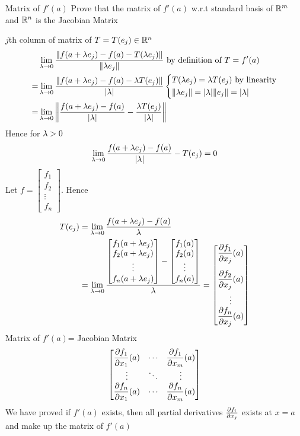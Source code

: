 \begin{Theorem}{Matrix of $f'(a)$}{}
	Prove that the matrix  of $f'(a)$ w.r.t standard basis of $\mathbb{R}^m$ and $\mathbb{R}^n$ is the Jacobian Matrix
\end{Theorem}
\begin{myproof}
	$j$th column of matrix of $T=T(e_j)\in\mathbb{R}^n$
\begin{align*}
	& \lim_{\lm\to0}\frac{\|f(a+\lm e_j)-f(a)-T(\lm e_j)\|}{\|\lm e_j\|}\text{ by definition of }T=f'(a)\\
	= & \lim_{\lm\to0}\frac{\|f(a+\lm e_j)-f(a)-\lm T(e_j)\|}{|\lm|}\begin{cases*}
		T(\lm e_j)=\lm T(e_j)\text{ by linearity} \\
		\|\lm e_j\|=|\lm|\|e_j\|=|\lm|
	\end{cases*}\\
	= & \lim_{\lm\to0}\left\|\frac{f(a+\lm e_j)-f(a)}{|\lm|}-\frac{\lm T(e_j)}{|\lm|}\right\|
\end{align*}Hence for $\lambda>0$ $$\lim_{\lambda\to0}\frac{f(a+\lambda e_j)-f(a)}{|\lambda|}-T(e_j)=0$$Let $f=\begin{bmatrix}
f_1\\ f_2 \\ \vdots\\ f_n\end{bmatrix}$. Hence \begin{align*}
T(e_j) & =\lim_{\lambda\to 0}\frac{f(a+\lambda e_j)-f(a)}{\lambda}\\
& =\lim_{\lambda\to 0}\frac{\begin{bmatrix}
	f_1(a+\lambda e_j) \\
	f_2(a+\lambda e_j) \\
	\vdots         \\
	f_n(a+\lambda e_j)
\end{bmatrix}-\begin{bmatrix}
	f_1(a) \\
	f_2(a) \\
	\vdots \\
	f_n(a)
\end{bmatrix}}{\lambda} =\begin{bmatrix}
		\dfrac{\partial f_1}{\partial x_j}(a) \\[5mm]
		\dfrac{\partial f_2}{\partial x_j}(a) \\[3mm]
		\vdots            \\
		\dfrac{\partial f_n}{\partial x_j}(a)
	\end{bmatrix}
\end{align*}Matrix of $f'(a)$= Jacobian Matrix $$\begin{bmatrix}
\dfrac{\partial f_1}{\partial x_1}(a) & \cdots & \dfrac{\partial f_1}{\partial x_m}(a)\\
\vdots & \ddots & \vdots\\
\dfrac{\partial f_n}{\partial x_1}(a) & \cdots & \dfrac{\partial f_n}{\partial x_m}(a)
\end{bmatrix}$$We have proved if $f'(a)$ exists, then  all partial derivatives  $\frac{\partial f_i}{\partial x_j}$ exists at $x=a$ and make up the matrix  of $f'(a)$
\end{myproof}

